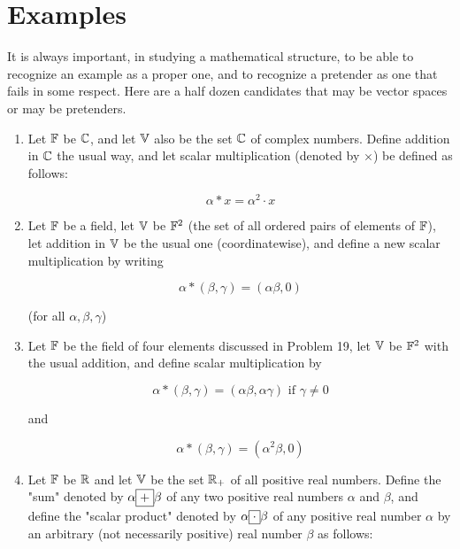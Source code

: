 \section{Examples}

It is always important, in studying a mathematical structure, to be able to recognize an example as a proper one, and to recognize a pretender as one that fails in some respect. Here are a half dozen candidates that may be vector spaces or may be pretenders.

\begin{enumerate}
    \item Let $\mathbb{F}$ be $\mathbb{C}$, and let $\mathbb{V}$ also be the set $\mathbb{C}$ of complex numbers. Define addition in $\mathbb{C}$ the usual way, and let scalar multiplication (denoted by $\times$) be defined as follows:

          \begin{equation}
              \alpha \ast x = \alpha^2 \cdot x
          \end{equation}

    \item Let $\mathbb{F}$ be a field, let $\mathbb{V}$ be $\mathbb{F}^2$ (the set of all ordered pairs of elements of $\mathbb{F}$), let addition in $\mathbb{V}$ be the usual one (coordinatewise), and define a new scalar multiplication by writing

          \begin{equation}
              \alpha \ast (\beta, \gamma) = (\alpha\beta, 0)
          \end{equation}

          (for all $\alpha,\beta,\gamma$)

    \item Let $\mathbb{F}$ be the field of four elements discussed in Problem 19, let $\mathbb{V}$ be $\mathbb{F}^2$ with the usual addition, and define scalar multiplication by

          \begin{equation}
              \alpha \ast (\beta, \gamma) = (\alpha\beta, \alpha\gamma) \text{ if } \gamma \neq 0
          \end{equation}

          and

          \begin{equation}
              \alpha \ast (\beta,\gamma) = (\alpha^2 \beta, 0)
          \end{equation}

    \item Let $\mathbb{F}$ be $\mathbb{R}$ and let $\mathbb{V}$ be the set $\mathbb{R}_+$ of all positive real numbers. Define the "sum" denoted by $\alpha \boxed{ + } \beta$ of any two positive real numbers $\alpha$ and $\beta$, and define the "scalar product" denoted by $\alpha \boxed{\cdot} \beta$ of any positive real number $\alpha$ by an arbitrary (not necessarily positive) real number $\beta$ as follows:


\end{enumerate}
